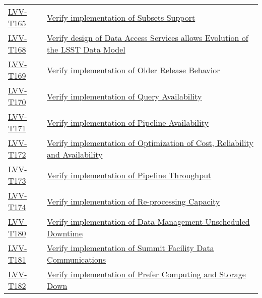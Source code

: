 \begin{longtable}[]{p{3cm}p{13cm}}
\protect\hyperlink{lvv-t165---verify-implementation-of-subsets-support}{LVV-T165}
&
\href{https://jira.lsstcorp.org/secure/Tests.jspa\#/testCase/LVV-T165}{Verify
implementation of Subsets Support}\tabularnewline
\protect\hyperlink{lvv-t168---verify-design-of-data-access-services-allows-evolution-of-the-lsst-data-model}{LVV-T168}
&
\href{https://jira.lsstcorp.org/secure/Tests.jspa\#/testCase/LVV-T168}{Verify
design of Data Access Services allows Evolution of the LSST Data
Model}\tabularnewline
\protect\hyperlink{lvv-t169---verify-implementation-of-older-release-behavior}{LVV-T169}
&
\href{https://jira.lsstcorp.org/secure/Tests.jspa\#/testCase/LVV-T169}{Verify
implementation of Older Release Behavior}\tabularnewline
\protect\hyperlink{lvv-t170---verify-implementation-of-query-availability}{LVV-T170}
&
\href{https://jira.lsstcorp.org/secure/Tests.jspa\#/testCase/LVV-T170}{Verify
implementation of Query Availability}\tabularnewline
\protect\hyperlink{lvv-t171---verify-implementation-of-pipeline-availability}{LVV-T171}
&
\href{https://jira.lsstcorp.org/secure/Tests.jspa\#/testCase/LVV-T171}{Verify
implementation of Pipeline Availability}\tabularnewline
\protect\hyperlink{lvv-t172---verify-implementation-of-optimization-of-cost-reliability-and-availability}{LVV-T172}
&
\href{https://jira.lsstcorp.org/secure/Tests.jspa\#/testCase/LVV-T172}{Verify
implementation of Optimization of Cost, Reliability and
Availability}\tabularnewline
\protect\hyperlink{lvv-t173---verify-implementation-of-pipeline-throughput}{LVV-T173}
&
\href{https://jira.lsstcorp.org/secure/Tests.jspa\#/testCase/LVV-T173}{Verify
implementation of Pipeline Throughput}\tabularnewline
\protect\hyperlink{lvv-t174---verify-implementation-of-re-processing-capacity}{LVV-T174}
&
\href{https://jira.lsstcorp.org/secure/Tests.jspa\#/testCase/LVV-T174}{Verify
implementation of Re-processing Capacity}\tabularnewline
\protect\hyperlink{lvv-t180---verify-implementation-of-data-management-unscheduled-downtime}{LVV-T180}
&
\href{https://jira.lsstcorp.org/secure/Tests.jspa\#/testCase/LVV-T180}{Verify
implementation of Data Management Unscheduled Downtime}\tabularnewline
\protect\hyperlink{lvv-t181---verify-implementation-of-summit-facility-data-communications}{LVV-T181}
&
\href{https://jira.lsstcorp.org/secure/Tests.jspa\#/testCase/LVV-T181}{Verify
implementation of Summit Facility Data Communications}\tabularnewline
\protect\hyperlink{lvv-t182---verify-implementation-of-prefer-computing-and-storage-down}{LVV-T182}
&
\href{https://jira.lsstcorp.org/secure/Tests.jspa\#/testCase/LVV-T182}{Verify
implementation of Prefer Computing and Storage Down}\tabularnewline

\end{longtable}
